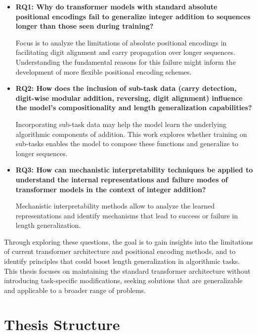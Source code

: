 \begin{itemize}
    \item \textbf{RQ1: Why do transformer models with standard absolute positional encodings fail to generalize integer addition to sequences longer than those seen during training?}
          
          Focus is to analyze the limitations of absolute positional encodings in facilitating digit alignment and carry propagation over longer sequences. Understanding the fundamental reasons for this failure might inform the development of more flexible positional encoding schemes.
          
    \item \textbf{RQ2: How does the inclusion of sub-task data (carry detection, digit-wise modular addition, reversing, digit alignment) influence the model's compositionality and length generalization capabilities?}
          
          Incorporating sub-task data may help the model learn the underlying algorithmic components of addition. This work explores whether training on sub-tasks enables the model to compose these functions and generalize to longer sequences.
          
    \item \textbf{RQ3: How can mechanistic interpretability techniques be applied to understand the internal representations and failure modes of transformer models in the context of integer addition?}
          
          Mechanistic interpretability methods allow to analyze the learned representations and identify mechanisms that lead to success or failure in length generalization.
          
\end{itemize}

Through exploring these questions, the goal is to gain insights into the limitations of current transformer architecture and positional encoding methods, and to identify principles that could boost length generalization in algorithmic tasks. This thesis focuses on maintaining the standard transformer architecture without introducing task-specific modifications, seeking solutions that are generalizable and applicable to a broader range of problems.


\section{Thesis Structure}

